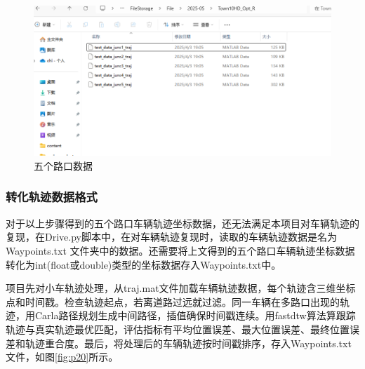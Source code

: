 \begin{figure}[htbp] %
	\centering
	\includegraphics[width=1\textwidth]{p19} %
	\caption{五个路口数据} %
	\label{fig:p19} %
\end{figure}






\subsubsection{转化轨迹数据格式}
对于以上步骤得到的五个路口车辆轨迹坐标数据，还无法满足本项目对车辆轨迹的复现，在Drive.py脚本中，在对车辆轨迹复现时，读取的车辆轨迹数据是名为 Waypoints.txt 文件夹中的数据。还需要将上文得到的五个路口车辆轨迹坐标数据转化为int(float或double)类型的坐标数据存入Waypoints.txt中。

项目先对小车轨迹处理，从traj.mat文件加载车辆轨迹数据，每个轨迹含三维坐标点和时间戳。检查轨迹起点，若离道路过远就过滤。同一车辆在多路口出现的轨迹，用Carla路径规划生成中间路径，插值确保时间戳连续。用fastdtw算法算跟踪轨迹与真实轨迹最优匹配，评估指标有平均位置误差、最大位置误差、最终位置误差和轨迹重合度。最后，将处理后的车辆轨迹按时间戳排序，存入Waypoints.txt文件，如图\ref{fig:p20}所示。


